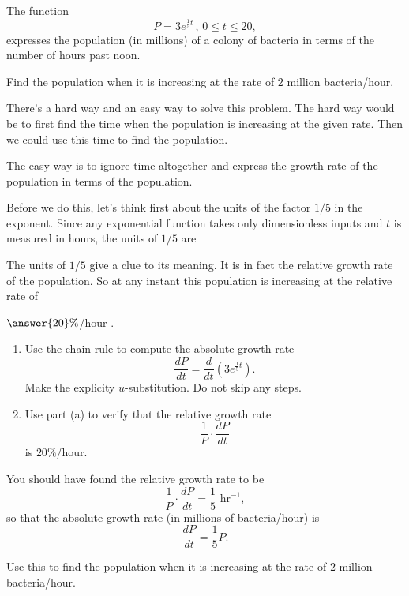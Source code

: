 \documentclass{ximera}
\begin{document}
\begin{example}  \label{Ex:KDFDFL}
The function
\[
       P = 3e^{\frac{1}{5}t} \, , \, 0\leq t \leq 20 ,
\]
expresses the population (in millions) of a colony of bacteria in terms of the number of hours past noon.

Find the population when it is increasing at the rate of $2$ million bacteria/hour.

\begin{explanation}
There's a hard way and an easy way to solve this problem. The hard way would be to first find the time when the population is increasing at the given rate. Then we could use this time to find the population.

The easy way is to ignore time altogether and express the growth rate of the population in terms of the population.

Before we do this, let's think first about the units of the factor $1/5$ in the exponent. Since any exponential function takes only dimensionless inputs and $t$ is measured in hours, the units of $1/5$ are 
\begin{question} \label{EROERERER}
\begin{multipleChoice}
\end{multipleChoice}
\end{question}

The units of $1/5$ give a clue to its meaning. It is in fact the relative growth rate of the population. So at any instant this population is increasing at the relative rate of 
\begin{question} \label{QERERERERER}
 $\answer{20}\%$/hour .
\end{question}

\begin{question}  \label{QODEERER}
\begin{enumerate}
\item Use the chain rule to compute the absolute growth rate
\[
\frac{dP}{dt} = \frac{d}{dt} \left(   3e^{\frac{1}{5}t}\right) .
\]
Make the explicity $u$-substitution. Do not skip any steps.

\item Use part (a) to verify that the relative growth rate 
\[
  \frac{1}{P} \cdot \frac{dP}{dt} 
\]
is $20\%$/hour.
\end{enumerate}

\end{question}

You should have found the relative growth rate to be
\[
   \frac{1}{P} \cdot \frac{dP}{dt} = \frac{1}{5}\text{ hr}^{-1} ,
\]
so that the absolute growth rate (in millions of bacteria/hour) is
\[
 \frac{dP}{dt} = \frac{1}{5}P .
\]

\begin{question} \label{QERdfsdf}
Use this to find the population when it is increasing at the rate of $2$ million bacteria/hour.
\end{question}

\end{explanation}

\end{example}
\end{document}
